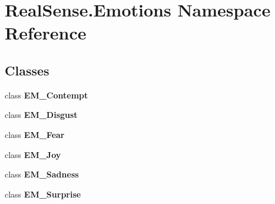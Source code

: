 \section{Real\+Sense.\+Emotions Namespace Reference}
\label{namespace_real_sense_1_1_emotions}
\subsection*{Classes}
\begin{DoxyCompactItemize}
\item 
class \textbf{ E\+M\+\_\+\+Contempt}
\item 
class \textbf{ E\+M\+\_\+\+Disgust}
\item 
class \textbf{ E\+M\+\_\+\+Fear}
\item 
class \textbf{ E\+M\+\_\+\+Joy}
\item 
class \textbf{ E\+M\+\_\+\+Sadness}
\item 
class \textbf{ E\+M\+\_\+\+Surprise}
\end{DoxyCompactItemize}
